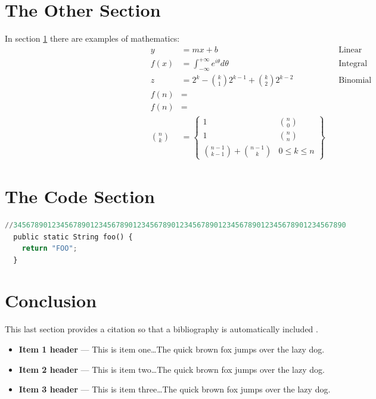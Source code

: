 \documentclass[11pt]{article}%
\begin{document}
\begin{multicols*}{2}
\section{The Other Section}
\label{The Other Section}

In section \ref{The Other Section} there are examples of
mathematics:\begin{align}
 y &= mx+b && \text{Linear} \\
 f(x) &= \int_{-\infty}^{+\infty} e^{i\theta} d\theta && \text{Integral} \\
 z &= 2^k-\binom{k}{1}2^{k-1}+\binom{k}{2}2^{k-2} &&\text{Binomial} \\
 f(n) &= \\
 f(n) &= \\
 {n \choose k} &= \begin{Bmatrix} 1 & {n \choose 0} \\ 1 & {n \choose n} \\ {n - 1 \choose k - 1} + {n - 1 \choose k} & 0 \le k \le n \end{Bmatrix} 
\end{align}

\section{The Code Section}
\label{The Code Section}

\begin{lstlisting}[language=Python,caption=\code{foo} method,label=foo]
//345678901234567890123456789012345678901234567890123456789012345678901234567890
  public static String foo() {
    return "FOO";
  }
\end{lstlisting}

\section{Conclusion}
\label{Conclusion}

This last section provides a citation so that a bibliography is
automatically included \citep{book:linear-algebra}.

\begin{itemize}
\item {\bf Item 1 header} --- This is item one\dots The quick brown fox jumps
over the lazy dog.
\item {\bf Item 2 header} --- This is item two\dots The quick brown fox jumps
over the lazy dog.
\item {\bf Item 3 header} --- This is item three\dots The quick brown fox jumps
over the lazy dog.
\end{itemize}



\end{multicols*}
\end{document}
